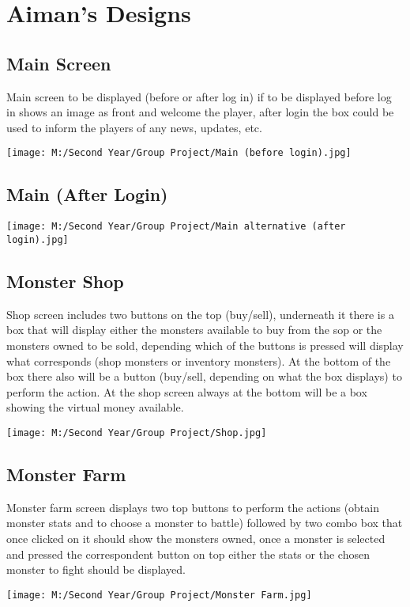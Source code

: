 \documentclass[titlepage]{article}
\begin{document}
\section{Aiman's Designs}
\subsection{Main Screen}
Main screen to be displayed  (before or after log in) if to be displayed before log in shows an image as front  and welcome the player, after login the box could be used to inform the players of any news, updates, etc.
\begin{figure*}[h]
\centering
\texttt{[image: M:/Second Year/Group Project/Main (before login).jpg]}
\label{fig:Main (before login)}
\end{figure*}
\newpage
\subsection{Main (After Login)}
\begin{figure*}[h]
\centering
\texttt{[image: M:/Second Year/Group Project/Main alternative (after login).jpg]}
\label{fig:Main alternative (after login)}
\end{figure*}
\newpage
\subsection{Monster Shop}
Shop screen includes two buttons on the top (buy/sell), underneath it there is a box that will display either the monsters available to buy from the sop or the monsters owned to be sold, depending which of the buttons is pressed  will display what corresponds (shop monsters or inventory monsters). At the bottom of the box there also will be a button (buy/sell, depending on what the box displays) to perform the action. At the shop screen always at the bottom will be a box showing the virtual money available.
\begin{figure*}[h]
\centering
\texttt{[image: M:/Second Year/Group Project/Shop.jpg]}
\label{fig:Shop}
\end{figure*}
\newpage
\subsection{Monster Farm}
Monster farm screen displays two top buttons to perform the actions (obtain monster stats and to choose a monster to battle) followed by two combo box that once clicked on it should show the monsters owned, once a monster is selected and pressed the correspondent button on top  either the stats or the chosen monster to fight should be displayed.
\begin{figure*}[h]
\centering
\texttt{[image: M:/Second Year/Group Project/Monster Farm.jpg]}
\label{fig:Monster Farm}
\end{figure*}
\end{document}
